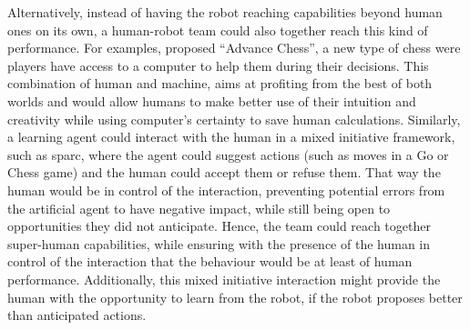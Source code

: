 Alternatively, instead of having the robot reaching capabilities beyond human ones on its own, a human-robot team could also together reach this kind of performance. For examples, \cite{kasparov2010chess} proposed ``Advance Chess'', a new type of chess were players have access to a computer to help them during their decisions. This combination of human and machine, aims at profiting from the best of both worlds and would allow humans to make better use of their intuition and creativity while using computer's certainty to save human calculations. Similarly, a learning agent could interact with the human in a mixed initiative framework, such as \gls{sparc}, where the agent could suggest actions (such as moves in a Go or Chess game) and the human could accept them or refuse them. That way the human would be in control of the interaction, preventing potential errors from the artificial agent to have negative impact, while still being open to opportunities they did not anticipate. Hence, the team could reach together super-human capabilities, while ensuring with the presence of the human in control of the interaction that the behaviour would be at least of human performance. Additionally, this mixed initiative interaction might provide the human with the opportunity to learn from the robot, if the robot proposes better than anticipated actions.




